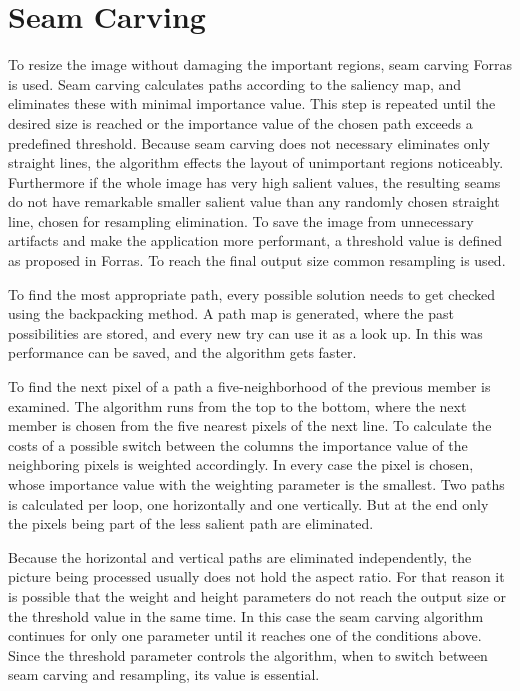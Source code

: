 \documentclass[draft,final]{vutinfth} %
\begin{document}
	\section{Seam Carving}
	To resize the image without damaging the important regions, seam carving Forras is used.
	Seam carving calculates paths according to the saliency map, and eliminates these with minimal importance value.
	This step is repeated until the desired size is reached or the importance value of the chosen path exceeds a predefined threshold.
	Because seam carving does not necessary eliminates only straight lines, the algorithm effects the layout of unimportant regions noticeably.
	Furthermore if the whole image has very high salient values, the resulting seams do not have remarkable smaller salient value than any randomly chosen straight line, chosen for resampling elimination.
	To save the image from unnecessary artifacts and make the application more performant, a threshold value is defined as proposed in Forras.
	To reach the final output size common resampling is used.\par 
	To find the most appropriate path, every possible solution needs to get checked using the backpacking method.
	A path map is generated, where the past possibilities are stored, and every new try can use it as a look up.
	In this was performance can be saved, and the algorithm gets faster.\par 
	To find the next pixel of a path a five-neighborhood of the previous member is examined.
	The algorithm runs from the top to the bottom, where the next member is chosen from the five nearest pixels of the next line.
	To calculate the costs of a possible switch between the columns the importance value of the neighboring pixels is weighted accordingly.
	In every case the pixel is chosen, whose importance value with the weighting parameter is the smallest.
	Two paths is calculated per loop, one horizontally and one vertically.
	But at the end only the pixels being part of the less salient path are eliminated.\par 
	Because the horizontal and vertical paths are eliminated independently, the picture being processed usually does not hold the aspect ratio.
	For that reason it is possible that the weight and height parameters do not reach the output size or the threshold value in the same time.
	In this case the seam carving algorithm continues for only one parameter until it reaches one of the conditions above. 
	Since the threshold parameter controls the algorithm, when to switch between seam carving and resampling, its value is essential. 
\end{document}
